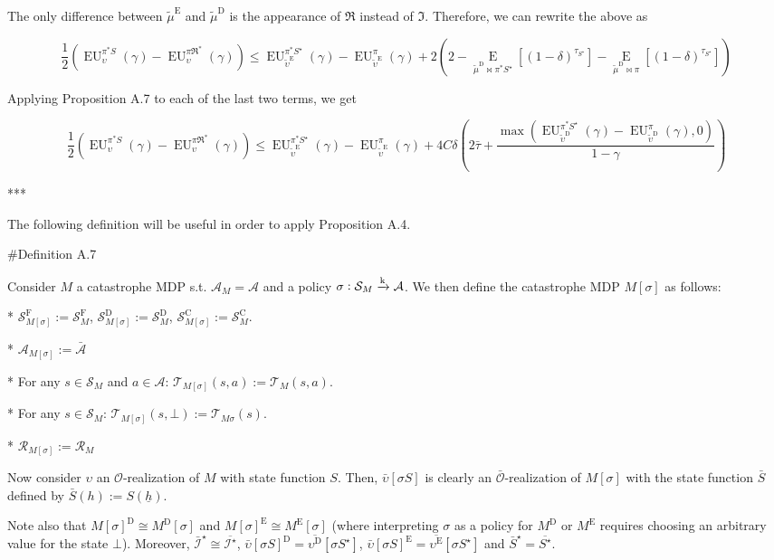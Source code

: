 \documentclass[a4paper]{article}
\newcommand{\AP}[1]{\left(#1\right)}
\newcommand{\AB}[1]{\left[#1\right]}
\newcommand{\Ea}[2]{\underset{#1}{\operatorname{E}}\AB{#2}}
\newcommand{\M}{\xrightarrow{\textnormal{k}}}
\newcommand{\Ob}{\mathcal{O}}
\newcommand{\A}{\mathcal{A}}
\newcommand{\St}{\mathcal{S}}
\newcommand{\T}{\mathcal{T}}
\newcommand{\R}{\mathcal{R}}
\newcommand{\In}{\mathcal{I}}
\newcommand{\Ado}{\bar{\Ob}}
\newcommand{\Ada}{\bar{\A}}
\newcommand{\RMC}{\mathrm{C}}
\newcommand{\RMD}{\mathrm{D}}
\newcommand{\RME}{\mathrm{E}}
\newcommand{\RMF}{\mathrm{F}}
\newcommand{\SF}{\St^{\RMF}}
\newcommand{\SD}{\St^{\RMD}}
\newcommand{\SC}{\St^{\RMC}}
\newcommand{\EU}{\operatorname{EU}}
\begin{document}
The only difference between $\tilde{\mu}^\RME$ and $\tilde{\mu}^\RMD$ is the appearance of $\Re$ instead of $\Im$. Therefore, we can rewrite the above as

$$\frac{1}{2}\AP{\EU_{\upsilon}^{\pi^* S}(\gamma)-\EU_{\upsilon}^{\pi\Re^*}(\gamma)} \leq \EU_{\tilde{\upsilon}^\RME}^{\pi^* S^\star}(\gamma)-\EU_{\tilde{\upsilon}^\RME}^{\pi}(\gamma) + 2\AP{2-\Ea{\tilde{\mu}^\RMD\bowtie\pi^*S^\star}{\AP{1-\delta}^{\tau_{S^\star}}}-\Ea{\tilde{\mu}^\RMD\bowtie\pi}{\AP{1-\delta}^{\tau_{S^\star}}}}$$

Applying Proposition A.7 to each of the last two terms, we get

$$\frac{1}{2}\AP{\EU_{\upsilon}^{\pi^* S}(\gamma)-\EU_{\upsilon}^{\pi\Re^*}(\gamma)} \leq \EU_{\tilde{\upsilon}^\RME}^{\pi^* S^\star}(\gamma)-\EU_{\tilde{\upsilon}^\RME}^{\pi}(\gamma) + 4C\delta\AP{2\bar{\tau}+\frac{\max\AP{\EU_{\tilde{\upsilon}^\RMD}^{\pi^* S^\star}(\gamma)-\EU_{\tilde{\upsilon}^\RMD}^{\pi}(\gamma),0}}{1-\gamma}}$$

***

The following definition will be useful in order to apply Proposition A.4.

\#Definition A.7

Consider $M$ a catastrophe MDP s.t. $\A_M = \A$ and a policy $\sigma: \St_M \M \A$. We then define the catastrophe MDP $M[\sigma]$ as follows:

* $\SF_{M[\sigma]} := \SF_M$, $\SD_{M[\sigma]} := \SD_M$, $\SC_{M[\sigma]} := \SC_M$.

* $\A_{M[\sigma]} := \Ada$

* For any $s \in \St_M$ and $a \in \A$: $\T_{M[\sigma]}(s,a) := \T_M(s,a)$.

* For any $s \in \St_M$: $\T_{M[\sigma]}(s,\bot) := \T_{M\sigma}(s)$. 

* $\R_{M[\sigma]} := \R_M$

Now consider $\upsilon$ an $\Ob$-realization of $M$ with state function $S$. Then, $\bar{\upsilon}[\sigma S]$ is clearly an $\Ado$-realization of $M[\sigma]$ with the state function $\bar{S}$ defined by $\bar{S}(h):=S\AP{\underline{h}}$.

Note also that $M[\sigma]^\RMD \cong M^\RMD[\sigma]$ and $M[\sigma]^\RME \cong M^\RME[\sigma]$ (where interpreting $\sigma$ as a policy for $M^\RMD$ or $M^\RME$ requires choosing an arbitrary value for the state $\bot$). Moreover, $\bar{\In}^\star \cong \overline{\In^\star}$, $\bar{\upsilon}[\sigma S]^\RMD = \overline{\upsilon^\RMD}[\sigma S^\star]$, $\bar{\upsilon}[\sigma S]^\RME = \overline{\upsilon^\RME}[\sigma S^\star]$ and $\bar{S}^\star = \overline{S^\star}$.
\end{document}
